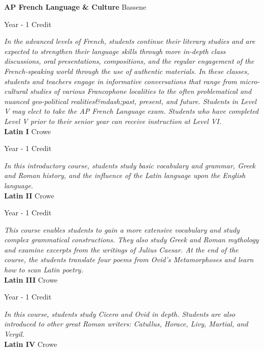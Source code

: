 \noindent\textbf{AP French Language \& Culture} \hfill Bassene

\noindent Year - 1 Credit

\vspace{1mm}\emph{In the advanced levels of French, students continue their literary studies and are expected to strengthen their language skills through more in-depth class discussions, oral presentations, compositions, and the regular engagement of the French-speaking world through the use of authentic materials. In these classes, students and teachers engage in informative conversations that range from micro-cultural studies of various Francophone localities to the often problematical and nuanced geo-political realities\&mdash;past, present, and future. Students in Level V may elect to take the AP French Language exam. Students who have completed Level V prior to their senior year can receive instruction at Level VI.}\\


\noindent\textbf{Latin I} \hfill Crowe

\noindent Year - 1 Credit

\vspace{1mm}\emph{In this introductory course, students study basic vocabulary and grammar, Greek and Roman history, and the influence of the Latin language upon the English language.}\\


\noindent\textbf{Latin II} \hfill Crowe

\noindent Year - 1 Credit

\vspace{1mm}\emph{This course enables students to gain a more extensive vocabulary and study complex grammatical constructions.  They also study Greek and Roman mythology and examine excerpts from the writings of Julius Caesar.  At the end of the course, the students translate four poems from Ovid’s Metamorphoses and learn how to scan Latin poetry.}\\


\noindent\textbf{Latin III} \hfill Crowe

\noindent Year - 1 Credit

\vspace{1mm}\emph{In this course, students study Cicero and Ovid in depth.  Students are also introduced to other great Roman writers: Catullus, Horace, Livy, Martial, and Vergil.}\\


\noindent\textbf{Latin IV} \hfill Crowe

